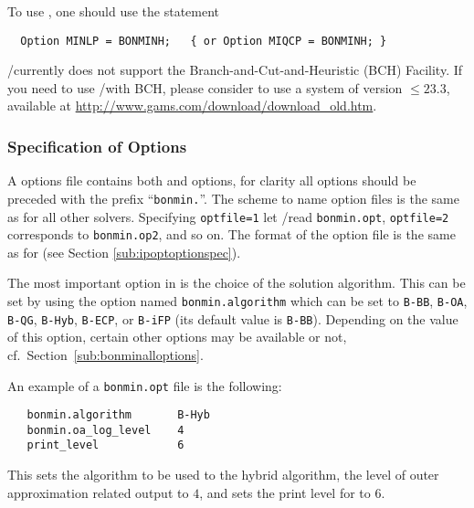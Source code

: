 To use \BONMINH, one should use the statement
\begin{verbatim}
  Option MINLP = BONMINH;   { or Option MIQCP = BONMINH; }
\end{verbatim}

\GAMS/\BONMIN currently does not support the \GAMS Branch-and-Cut-and-Heuristic (BCH) Facility.
If you need to use \GAMS/\BONMIN with BCH, please consider to use a \GAMS system of version $\leq 23.3$, available at \url{http://www.gams.com/download/download_old.htm}.

\subsubsection{Specification of Options}

A \BONMIN options file contains both \IPOPT and \BONMIN options, for clarity all \BONMIN options should be preceded with the prefix ``\texttt{bonmin.}''. %
The scheme to name option files is the same as for all other \GAMS solvers.
Specifying \texttt{optfile=1} let \GAMS/\BONMIN read \texttt{bonmin.opt}, \texttt{optfile=2} corresponds to \texttt{bonmin.op2}, and so on.
The format of the option file is the same as for \IPOPT (see Section \ref{sub:ipoptoptionspec}).

The most important option in \BONMIN is the choice of the solution algorithm.
This can be set by using the option named \texttt{bonmin.algorithm} which can be set to \texttt{B-BB}, \texttt{B-OA}, \texttt{B-QG}, \texttt{B-Hyb}, \texttt{B-ECP}, or \texttt{B-iFP} (its default value is \texttt{B-BB}).
Depending on the value of this option, certain other options may be available or not, cf.\ Section~\ref{sub:bonminalloptions}.

An example of a \texttt{bonmin.opt} file is the following:
\begin{verbatim}
   bonmin.algorithm       B-Hyb
   bonmin.oa_log_level    4
   print_level            6
\end{verbatim}
This sets the algorithm to be used to the hybrid algorithm, the level of outer approximation related output to $4$,
and sets the print level for \IPOPT to $6$.

